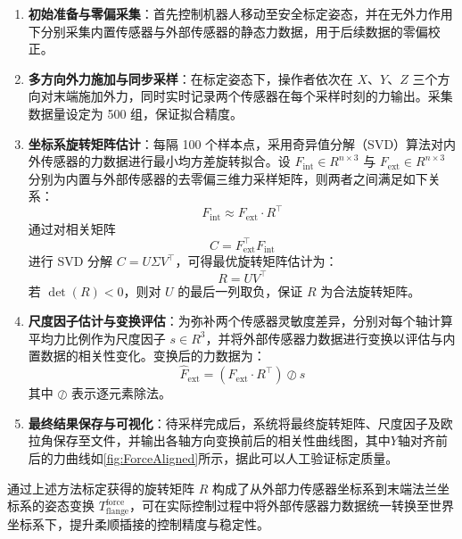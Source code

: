 \documentclass{Diploma}
\begin{document}
\begin{enumerate}
  \item \textbf{初始准备与零偏采集}：首先控制机器人移动至安全标定姿态，并在无外力作用下分别采集内置传感器与外部传感器的静态力数据，用于后续数据的零偏校正。
  \item \textbf{多方向外力施加与同步采样}：在标定姿态下，操作者依次在 $X$、$Y$、$Z$ 三个方向对末端施加外力，同时实时记录两个传感器在每个采样时刻的力输出。采集数据量设定为 500 组，保证拟合精度。
  \item \textbf{坐标系旋转矩阵估计}：每隔 100 个样本点，采用奇异值分解（SVD）算法对内外传感器的力数据进行最小均方差旋转拟合。设 $F_{\text{int}} \in R^{n\times3}$ 与 $F_{\text{ext}} \in R^{n\times3}$ 分别为内置与外部传感器的去零偏三维力采样矩阵，则两者之间满足如下关系：
  \begin{equation}
    F_{\text{int}} \approx F_{\text{ext}} \cdot R^\top
    \label{eq:force_relation}
  \end{equation}
  通过对相关矩阵
  \begin{equation}
    C = F_{\text{ext}}^\top F_{\text{int}}
    \label{eq:correlation_matrix}
  \end{equation}
  进行 SVD 分解 $C = U \Sigma V^\top$，可得最优旋转矩阵估计为：
  \begin{equation}
    R = U V^\top
    \label{eq:rotation_matrix}
  \end{equation}
  若 $\det(R) < 0$，则对 $U$ 的最后一列取负，保证 $R$ 为合法旋转矩阵。
  \item \textbf{尺度因子估计与变换评估}：为弥补两个传感器灵敏度差异，分别对每个轴计算平均力比例作为尺度因子 $s \in R^3$，并将外部传感器力数据进行变换以评估与内置数据的相关性变化。变换后的力数据为：
  \begin{equation}
    \hat{F}_{\text{ext}} = (F_{\text{ext}} \cdot R^\top) \oslash s
    \label{eq:scaled_force}
  \end{equation}
  其中 $\oslash$ 表示逐元素除法。
  \item \textbf{最终结果保存与可视化}：待采样完成后，系统将最终旋转矩阵、尺度因子及欧拉角保存至文件，并输出各轴方向变换前后的相关性曲线图，其中$Y$轴对齐前后的力曲线如\ref{fig:ForceAligned}所示，据此可以人工验证标定质量。
\end{enumerate}

%

通过上述方法标定获得的旋转矩阵 $R$ 构成了从外部力传感器坐标系到末端法兰坐标系的姿态变换 $T_{\text{flange}}^{\text{force}}$，可在实际控制过程中将外部传感器力数据统一转换至世界坐标系下，提升柔顺插接的控制精度与稳定性。
\end{document}
